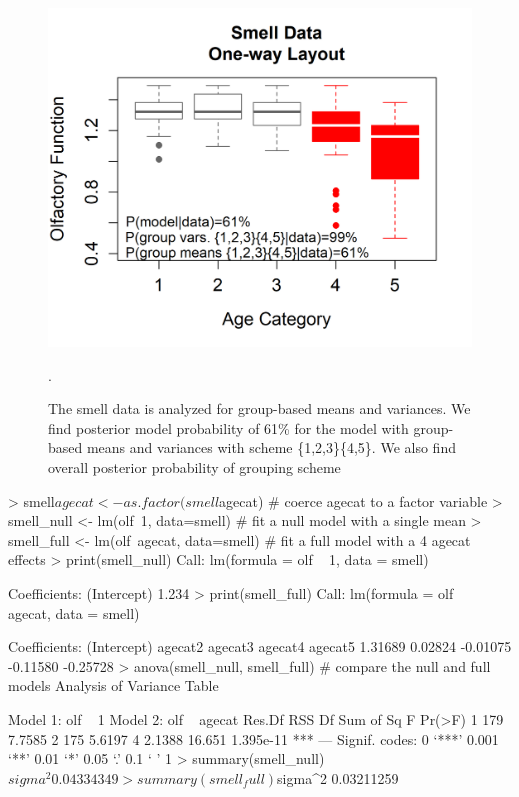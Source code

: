 \begin{figure}
    \centering
    \includegraphics{figures/smell1.png}
    \caption{The smell data \citep{smell} is analyzed for group-based means and variances. We find posterior model probability of 61\% for the model with group-based means and variances with scheme \{1,2,3\}\{4,5\}. We also find overall posterior probability of grouping scheme }. 
    \label{figure:smell}
\end{figure}

\begin{example*} %
> smell$agecat <- as.factor(smell$agecat) # coerce agecat to a factor variable
> smell_null <- lm(olf~1, data=smell) # fit a null model with a single mean
> smell_full <- lm(olf~agecat, data=smell) # fit a full model with a 4 agecat effects
> print(smell_null) 
Call:
lm(formula = olf ~ 1, data = smell)

Coefficients:
(Intercept)  
      1.234 
> print(smell_full) 
Call:
lm(formula = olf ~ agecat, data = smell)

Coefficients:
(Intercept)      agecat2      agecat3      agecat4      agecat5  
    1.31689      0.02824     -0.01075     -0.11580     -0.25728  
> anova(smell_null, smell_full) # compare the null and full models
Analysis of Variance Table

Model 1: olf ~ 1
Model 2: olf ~ agecat
  Res.Df    RSS Df Sum of Sq      F    Pr(>F)    
1    179 7.7585                                  
2    175 5.6197  4    2.1388 16.651 1.395e-11 ***
---
Signif. codes:  0 ‘***’ 0.001 ‘**’ 0.01 ‘*’ 0.05 ‘.’ 0.1 ‘ ’ 1
> summary(smell_null)$sigma^2
0.04334349
> summary(smell_full)$sigma^2
0.03211259
\end{example*}

